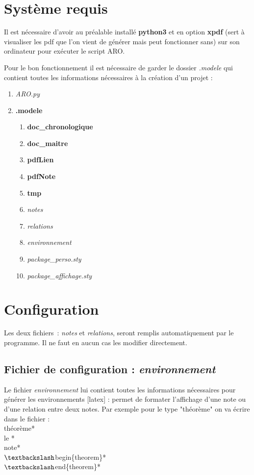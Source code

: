 \documentclass[12pt,a4paper]{article}
\begin{document}
	\section{Système requis}
	
	Il est nécessaire d'avoir au préalable installé \textbf{python3} et en option \textbf{xpdf} (sert à visualiser les pdf que l'on vient de générer mais peut fonctionner sans) sur son ordinateur pour exécuter le script ARO.
	
	Pour le bon fonctionnement il est nécessaire de garder le dossier \textit{.modele} qui contient toutes les informations nécessaires à la création d'un projet :
	
	\begin{enumerate}[label=$\star$]
		\item \textit{ARO.py}
		\item \textbf{.modele}
		\begin{enumerate}[label=$-$]
			\item \textbf{doc\_chronologique}
			\item \textbf{doc\_maitre}
			\item \textbf{pdfLien}
			\item \textbf{pdfNote}
			\item \textbf{tmp}
			\item \textit{notes}
			\item \textit{relations}
			\item \textit{environnement}
			\item \textit{package\_perso.sty}
			\item \textit{package\_affichage.sty}
		\end{enumerate}
	\end{enumerate}
	
	\section{Configuration}	
	
	Les deux fichiers : \textit{notes} et \textit{relations}, seront remplis automatiquement par le programme. Il ne faut en aucun cas les modifier directement.
	
	\subsection{Fichier de configuration : \textit{environnement}}
	
	 Le fichier \textit{environnement} lui contient toutes les informations nécessaires pour générer les environnements [latex] : permet de formater l'affichage d'une note ou d'une relation entre deux notes. Par exemple pour le type "théorème" on va écrire dans le fichier :\\
	 théorème*\\
	 le *\\
	 note*\\
	 $\textbackslash$begin\{theorem\}*\\
	 $\textbackslash$end\{theorem\}*
	 
\end{document}
